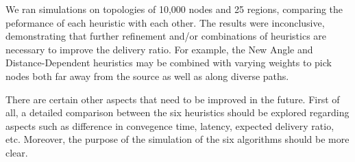 \documentclass[conference]{IEEEtran}
\begin{document}
We ran simulations on topologies of 10,000 nodes and 25 regions, comparing the peformance of each heuristic with each other.
The results were inconclusive, demonstrating that further refinement and/or combinations of heuristics are necessary to improve the delivery ratio.
For example, the New Angle and Distance-Dependent heuristics may be combined with varying weights to pick nodes both far away from the source as well as along diverse paths.

There are certain other aspects that need to be improved in the future.
First of all, a detailed comparison between the six heuristics should be explored regarding aspects such as difference in convegence time, latency, expected delivery ratio, etc.
Moreover, the purpose of the simulation of the six algorithms should be more clear.




\end{document}
